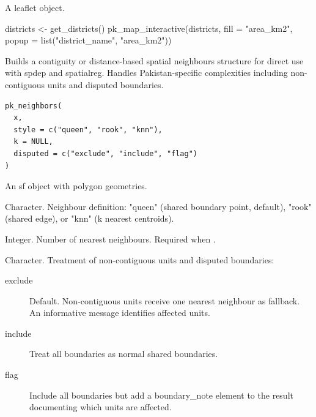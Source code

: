 \documentclass[a4paper]{book}
\begin{document}
%
\begin{Value}
A leaflet object.
\end{Value}
%
\begin{Examples}
\begin{ExampleCode}

  districts <- get_districts()
  pk_map_interactive(districts,
                      fill = "area_km2",
                      popup = list("district_name", "area_km2"))

\end{ExampleCode}
\end{Examples}
%
\begin{Description}
Builds a contiguity or distance-based spatial neighbours structure
for direct use with spdep and spatialreg. Handles Pakistan-specific
complexities including non-contiguous units and disputed boundaries.
\end{Description}
%
\begin{Usage}
\begin{verbatim}
pk_neighbors(
  x,
  style = c("queen", "rook", "knn"),
  k = NULL,
  disputed = c("exclude", "include", "flag")
)
\end{verbatim}
\end{Usage}
%
\begin{Arguments}
\begin{ldescription}
\item[\code{x}] An sf object with polygon geometries.

\item[\code{style}] Character. Neighbour definition: "queen" (shared boundary
point, default), "rook" (shared edge), or "knn" (k nearest centroids).

\item[\code{k}] Integer. Number of nearest neighbours. Required when
.

\item[\code{disputed}] Character. Treatment of non-contiguous units and
disputed boundaries:
\begin{description}

\item[exclude] Default. Non-contiguous units receive one nearest
neighbour as fallback. An informative message identifies affected units.
\item[include] Treat all boundaries as normal shared boundaries.
\item[flag] Include all boundaries but add a boundary\_note element
to the result documenting which units are affected.

\end{description}

\end{ldescription}
\end{Arguments}
\end{document}

